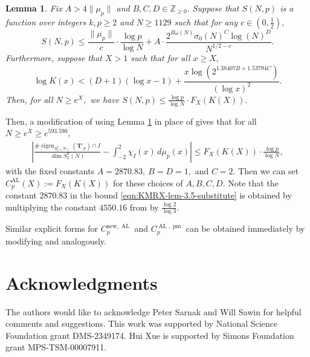 \documentclass[11pt,letterpaper,reqno]{amsart}
\newtheorem{lemma}[theorem]{Lemma}
\theoremstyle{definition}
\numberwithin{equation}{section}
\numberwithin{figure}{section}
\numberwithin{table}{section}
\newcommand{\nw}{\mathrm{new}}
\begin{document}
\begin{lemma}\label{lem:KMRX-lem-3.4-substitute}
    Fix $A > 4 \| \mu_p \|$ and $B, C, D \in \mathbb{Z}_{\geq 0}.$ Suppose that $S(N, p)$ is a function over integers $k, p \geq 2$ and $N \geq 1129$ such that for any $c \in \left( 0, \frac{1}{2} \right),$
    $$S(N, p) \leq \frac{\| \mu_p \|}{c} \cdot \frac{\log p}{\log N} + A \cdot \frac{2^{ B\omega(N)} \sigma_0(N)^C \log(N)^D}{N^{1/2 - c}}.$$
    Furthermore, suppose that $X > 1$ such that for all $x \geq X,$
    \begin{equation}
            \log K(x) < (D + 1) \left( \log x - 1 \right) + \frac{x \log\left( 2^{1.38407B +  1.53794C} \right)}{\left( \log x \right)^2}.
        \end{equation}
    Then, for all $N \geq e^X,$ we have $S(N, p) \leq \frac{\log p}{\log N} \cdot F_X(K(X)).$
\end{lemma}

Then, a modification of \cite[Lemma 3.5]{KMRX} using Lemma \ref{lem:KMRX-lem-3.4-substitute} in place of \cite[Lemma 3.4]{KMRX} gives that for all $N \geq e^X \geq e^{593.590}$,
\begin{align}
    \left| \frac{\# \operatorname{eigen}_{S_2^\sigma(N)}(\mathbf{T}'_p) \cap I}{\dim S_2^\sigma(N)} - \int_{-2}^2 \chi_I (x) \, d \mu_p(x)  \right| \leq F_{X}(K(X)) \cdot \frac{\log p}{\log N}, \label{eqn:KMRX-lem-3.5-substitute}
\end{align}
with the fixed constants $A = 2870.83, \ B = D = 1,$ and $C = 2.$ Then we can set $C_p^{\operatorname{AL}}(X) := F_X(K(X))$ for these choices of $A,B,C,D$.
Note that the constant $2870.83$ in the bound \eqref{eqn:KMRX-lem-3.5-substitute} is obtained by multiplying the constant $4550.16$ from \cite[Lemma 3.5]{KMRX} by $\frac{\log 2}{\log 3}$. 

Similar explicit forms for $C_p^{\nw, \operatorname{AL}}$ and $C_p^{\operatorname{AL}, \operatorname{pm}}$ can be obtained immediately by modifying \cite[Lemma 3.6]{KMRX} and \cite[Lemma 3.8]{KMRX} analogously.


\section*{Acknowledgments}

The authors would like to acknowledge Peter Sarnak and Will Sawin for helpful comments and suggestions. This work was supported by National Science Foundation grant DMS-2349174. Hui Xue is supported by Simons Foundation grant MPS-TSM-00007911.





\end{document}
